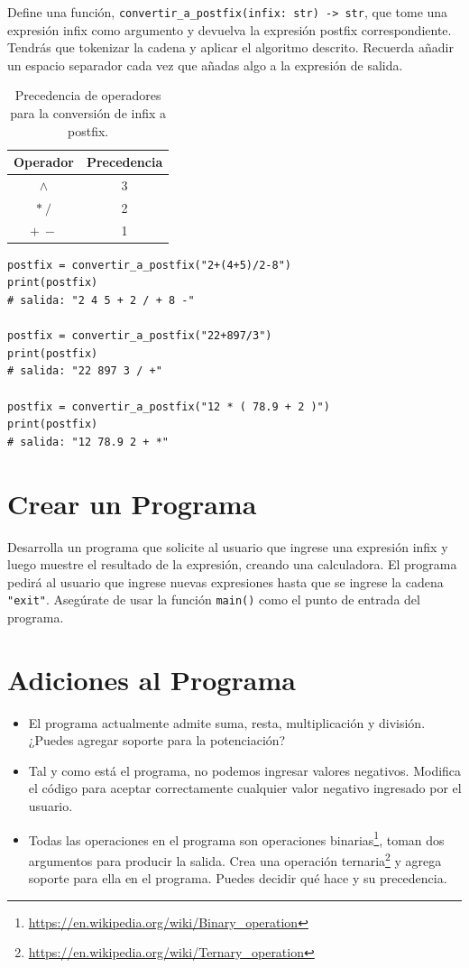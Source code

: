 \documentclass[10pt,a4paper]{article}
\begin{document}
Define una función, \lstinline|convertir_a_postfix(infix: str) -> str|, que tome una expresión infix como argumento y devuelva la expresión postfix correspondiente. Tendrás que tokenizar la cadena y aplicar el algoritmo descrito. Recuerda añadir un espacio separador cada vez que añadas algo a la expresión de salida.

\begin{table}[h!tbp]
\centering
\renewcommand{\arraystretch}{1.5}
\begin{tabular}{cc}
\toprule
\textbf{Operador} & \textbf{Precedencia} \\ 
\midrule
$\wedge$ & 3 \\ 
$*\ /$ & 2 \\ 
$+\ -$ & 1 \\ 
\bottomrule
\end{tabular}
\caption{Precedencia de operadores para la conversión de infix a postfix.}
\label{tab:operator_precedence}
\end{table}

\begin{lstlisting}
postfix = convertir_a_postfix("2+(4+5)/2-8")
print(postfix)
# salida: "2 4 5 + 2 / + 8 -"

postfix = convertir_a_postfix("22+897/3")
print(postfix)
# salida: "22 897 3 / +"

postfix = convertir_a_postfix("12 * ( 78.9 + 2 )")
print(postfix)
# salida: "12 78.9 2 + *"
\end{lstlisting}

\section{Crear un Programa}
Desarrolla un programa que solicite al usuario que ingrese una expresión infix y luego muestre el resultado de la expresión, creando una calculadora. El programa pedirá al usuario que ingrese nuevas expresiones hasta que se ingrese la cadena \lstinline|"exit"|. Asegúrate de usar la función \lstinline|main()| como el punto de entrada del programa.

\section{Adiciones al Programa}

\begin{itemize}
\item El programa actualmente admite suma, resta, multiplicación y división. ¿Puedes agregar soporte para la potenciación?
\item Tal y como está el programa, no podemos ingresar valores negativos. Modifica el código para aceptar correctamente cualquier valor negativo ingresado por el usuario.
\item Todas las operaciones en el programa son operaciones binarias\footnote{\href{https://en.wikipedia.org/wiki/Binary_operation}{https://en.wikipedia.org/wiki/Binary\_operation}}, toman dos argumentos para producir la salida. Crea una operación ternaria\footnote{\href{https://en.wikipedia.org/wiki/Ternary_operation}{https://en.wikipedia.org/wiki/Ternary\_operation}} y agrega soporte para ella en el programa. Puedes decidir qué hace y su precedencia.
\end{itemize}
\end{document}
